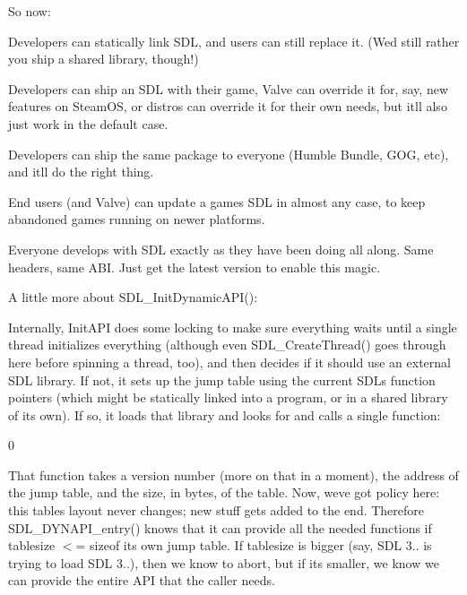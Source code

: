 So now:\+
\begin{DoxyItemize}
\item Developers can statically link SDL, and users can still replace it. (We\textquotesingle{}d still rather you ship a shared library, though!)
\item Developers can ship an SDL with their game, Valve can override it for, say, new features on Steam\+OS, or distros can override it for their own needs, but it\textquotesingle{}ll also just work in the default case.
\item Developers can ship the same package to everyone (Humble Bundle, GOG, etc), and it\textquotesingle{}ll do the right thing.
\item End users (and Valve) can update a game\textquotesingle{}s SDL in almost any case, to keep abandoned games running on newer platforms.
\item Everyone develops with SDL exactly as they have been doing all along. Same headers, same ABI. Just get the latest version to enable this magic.
\end{DoxyItemize}

A little more about SDL\+\_\+\+Init\+Dynamic\+API():\+

Internally, Init\+API does some locking to make sure everything waits until a single thread initializes everything (although even SDL\+\_\+\+Create\+Thread() goes through here before spinning a thread, too), and then decides if it should use an external SDL library. If not, it sets up the jump table using the current SDL\textquotesingle{}s function pointers (which might be statically linked into a program, or in a shared library of its own). If so, it loads that library and looks for and calls a single function:\+


\begin{DoxyCode}{0}

\end{DoxyCode}


That function takes a version number (more on that in a moment), the address of the jump table, and the size, in bytes, of the table. Now, we\textquotesingle{}ve got policy here:\+ this table\textquotesingle{}s layout never changes; new stuff gets added to the end. Therefore SDL\+\_\+\+DYNAPI\+\_\+entry() knows that it can provide all the needed functions if tablesize \texorpdfstring{$<$}{<}= sizeof its own jump table. If tablesize is bigger (say, SDL 3.. is trying to load SDL 3..), then we know to abort, but if it\textquotesingle{}s smaller, we know we can provide the entire API that the caller needs.

